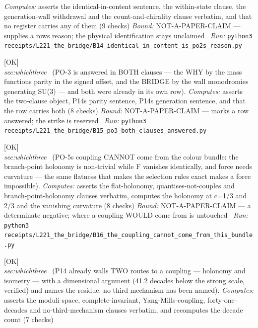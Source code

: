 \begin{description}
\emph{Computes:} asserts the identical-in-content sentence, the within-state clause, the generation-wall withdrawal and the count-and-chirality clause verbatim, and that no register carries any of them (9 checks)
 \emph{Bound:} NOT-A-PAPER-CLAIM --- supplies a rows reason; the physical identification stays unclaimed
\ \emph{Run:} \texttt{python3 receipts/L221\_the\_bridge/B14\_identical\_in\_content\_is\_po2s\_reason.py}
\item[\label{rcpt:B15_po3_both_clauses_answered}\textbf{}\quad\texttt{B15\_po3\_both\_clauses\_answered}]\hfill\textsf{[OK]}\\
\textit{sec:whichthree} \ (PO-3 is answered in BOTH clauses --- the WHY by the mass functions parity in the signed offset, and the BRIDGE by the wall monodromies generating SU(3) --- and both were already in its own row). 
\emph{Computes:} asserts the two-clause object, P14s parity sentence, P14s generation sentence, and that the row carries both (8 checks)
 \emph{Bound:} NOT-A-PAPER-CLAIM --- marks a row answered; the strike is reserved
\ \emph{Run:} \texttt{python3 receipts/L221\_the\_bridge/B15\_po3\_both\_clauses\_answered.py}
\item[\label{rcpt:B16_the_coupling_cannot_come_from_this_bundle}\textbf{}\quad\texttt{B16\_the\_coupling\_cannot\_come\_from\_this\_bundle}]\hfill\textsf{[OK]}\\
\textit{sec:whichthree} \ (PO-5s coupling CANNOT come from the colour bundle: the branch-point holonomy is non-trivial while F vanishes identically, and force needs curvature --- the same flatness that makes the selection rules exact makes a force impossible). 
\emph{Computes:} asserts the flat-holonomy, quantises-not-couples and branch-point-holonomy clauses verbatim, computes the holonomy at c=1/3 and 2/3 and the vanishing curvature (8 checks)
 \emph{Bound:} NOT-A-PAPER-CLAIM --- a determinate negative; where a coupling WOULD come from is untouched
\ \emph{Run:} \texttt{python3 receipts/L221\_the\_bridge/B16\_the\_coupling\_cannot\_come\_from\_this\_bundle.py}
\item[\label{rcpt:B17_the_paper_already_walls_two_routes}\textbf{}\quad\texttt{B17\_the\_paper\_already\_walls\_two\_routes}]\hfill\textsf{[OK]}\\
\textit{sec:whichthree} \ (P14 already walls TWO routes to a coupling --- holonomy and isometry --- with a dimensional argument (41.2 decades below the strong scale, verified) and names the residue: no third mechanism has been named). 
\emph{Computes:} asserts the moduli-space, complete-invariant, Yang-Mills-coupling, forty-one-decades and no-third-mechanism clauses verbatim, and recomputes the decade count (7 checks)

\end{description}
